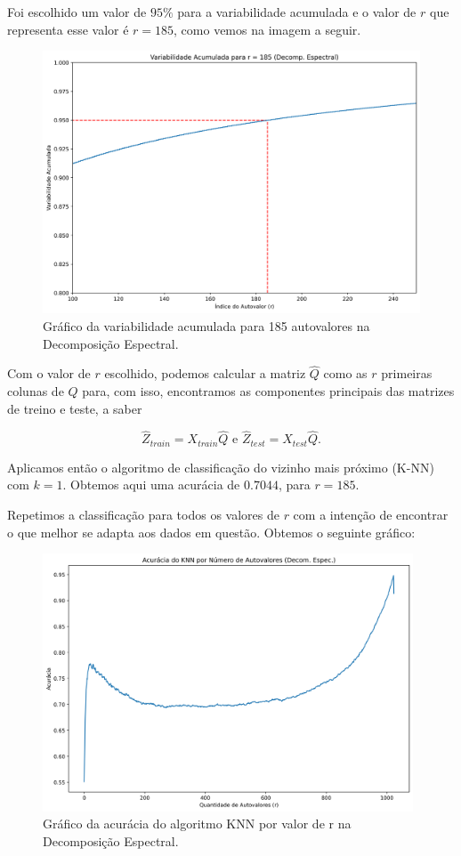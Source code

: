 \documentclass[a4paper, 12pt]{article}
\theoremstyle{definition}
\theoremstyle{remark}
\begin{document}
Foi escolhido um valor de $95\%$ para a variabilidade acumulada e o valor de $r$ que representa esse valor é $r = 185$, como vemos na imagem a seguir.

\begin{figure}[H]
  \centering
  \includegraphics[width=12cm]{var_acu_espectral_185}
  \caption{Gráfico da variabilidade acumulada para 185 autovalores na Decomposição Espectral.}
\end{figure}

Com o valor de $r$ escolhido, podemos calcular a matriz $\hat{Q}$ como as $r$ primeiras colunas de $Q$ para, com isso, encontramos as componentes principais das matrizes de treino e teste, a saber

$$\hat{Z}_{train} = X_{train}\hat{Q} \text{ e } \hat{Z}_{test} = X_{test}\hat{Q}.$$

Aplicamos então o algoritmo de classificação do vizinho mais próximo (K-NN) com $k = 1$. Obtemos aqui uma acurácia de $0.7044$, para $r = 185$.

Repetimos a classificação para todos os valores de $r$ com a intenção de encontrar o que melhor se adapta aos dados em questão. Obtemos o seguinte gráfico:

\begin{figure}[H]
  \centering
  \includegraphics[width=11cm]{acuracia_espectral}
  \caption{Gráfico da acurácia do algoritmo KNN por valor de r na Decomposição Espectral.}
\end{figure}
\end{document}
